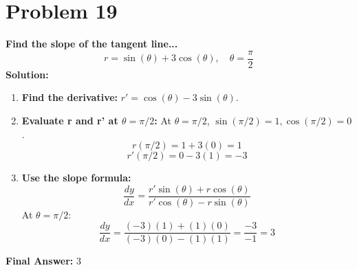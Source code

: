 \documentclass{article}
\begin{document}
\section*{Problem 19}
\textbf{Find the slope of the tangent line...}
\[ r = \sin(\theta) + 3\cos(\theta), \quad \theta = \frac{\pi}{2} \]
\textbf{Solution:}
\begin{enumerate}
    \item \textbf{Find the derivative:} $r' = \cos(\theta) - 3\sin(\theta)$.
    \item \textbf{Evaluate r and r' at $\theta = \pi/2$:}
    At $\theta=\pi/2$, $\sin(\pi/2)=1, \cos(\pi/2)=0$.
    \[ r(\pi/2) = 1 + 3(0) = 1 \]
    \[ r'(\pi/2) = 0 - 3(1) = -3 \]
    \item \textbf{Use the slope formula:}
    \[ \frac{dy}{dx} = \frac{r' \sin(\theta) + r \cos(\theta)}{r' \cos(\theta) - r \sin(\theta)} \]
    At $\theta = \pi/2$:
    \[ \frac{dy}{dx} = \frac{(-3)(1) + (1)(0)}{(-3)(0) - (1)(1)} = \frac{-3}{-1} = 3 \]
\end{enumerate}
\textbf{Final Answer:} $3$
\end{document}
